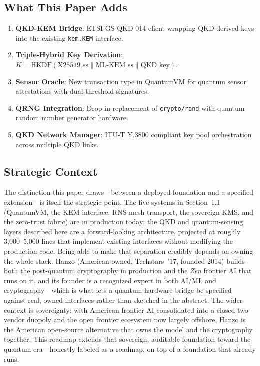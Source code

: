 \documentclass[11pt,letterpaper]{article}
\begin{document}
\subsection{What This Paper Adds}

\begin{enumerate}
\item \textbf{QKD-KEM Bridge}: ETSI GS QKD 014 client wrapping QKD-derived keys into the existing \texttt{kem.KEM} interface.
\item \textbf{Triple-Hybrid Key Derivation}: $K = \text{HKDF}(\text{X25519\_ss} \| \text{ML-KEM\_ss} \| \text{QKD\_key})$.
\item \textbf{Sensor Oracle}: New transaction type in QuantumVM for quantum sensor attestations with dual-threshold signatures.
\item \textbf{QRNG Integration}: Drop-in replacement of \texttt{crypto/rand} with quantum random number generator hardware.
\item \textbf{QKD Network Manager}: ITU-T Y.3800 compliant key pool orchestration across multiple QKD links.
\end{enumerate}

\subsection{Strategic Context}

The distinction this paper draws---between a deployed foundation and a specified extension---is itself the strategic point. The five systems in Section~1.1 (QuantumVM, the KEM interface, RNS mesh transport, the sovereign KMS, and the zero-trust fabric) are in production today; the QKD and quantum-sensing layers described here are a forward-looking architecture, projected at roughly 3,000--5,000 lines that implement existing interfaces without modifying the production code. Being able to make that separation credibly depends on owning the whole stack. Hanzo (American-owned, Techstars~'17, founded 2014) builds both the post-quantum cryptography in production and the \emph{Zen} frontier AI that runs on it, and its founder is a recognized expert in both AI/ML and cryptography---which is what lets a quantum-hardware bridge be specified against real, owned interfaces rather than sketched in the abstract. The wider context is sovereignty: with American frontier AI consolidated into a closed two-vendor duopoly and the open frontier ecosystem now largely offshore, Hanzo is the American open-source alternative that owns the model and the cryptography together. This roadmap extends that sovereign, auditable foundation toward the quantum era---honestly labeled as a roadmap, on top of a foundation that already runs.
\end{document}
